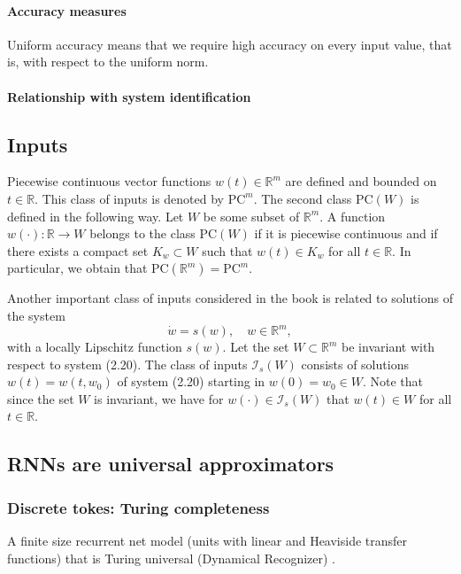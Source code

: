 \documentclass{article}
\theoremstyle{definition}
\theoremstyle{remark}
\begin{document}
\paragraph{Accuracy measures}
Uniform accuracy means that we require high accuracy on every input value, that is, with respect to the uniform norm. 

\paragraph{Relationship with system identification}
\citep{ljung2010perspectives, nelles2020nonlinear}



\subsection{Inputs}
Piecewise continuous vector functions \( w(t) \in \mathbb{R}^m \) are defined and bounded on \( t \in \mathbb{R} \). This class of inputs is denoted by \( \text{PC}^m \). The second class \( \text{PC}(W) \) is defined in the following way. Let \( W \) be some subset of \( \mathbb{R}^m \). A function \( w(\cdot) : \mathbb{R} \to W \) belongs to the class \( \text{PC}(W) \) if it is piecewise continuous and if there exists a compact set \( K_w \subset W \) such that \( w(t) \in K_w \) for all \( t \in \mathbb{R} \). In particular, we obtain that \( \text{PC}(\mathbb{R}^m) = \text{PC}^m \).

Another important class of inputs considered in the book is related to solutions of the system
\[
\dot{w} = s(w), \quad w \in \mathbb{R}^m, \tag{2.20}
\]
with a locally Lipschitz function \( s(w) \). Let the set \( W \subset \mathbb{R}^m \) be invariant with respect to system (2.20). The class of inputs \( \mathcal{I}_s(W) \) consists of solutions \( w(t) = w(t, w_0) \) of system (2.20) starting in \( w(0) = w_0 \in W \). Note that since the set \( W \) is invariant, we have for \( w(\cdot) \in \mathcal{I}_s(W) \) that \( w(t) \in W \) for all \( t \in \mathbb{R} \).




\subsection{RNNs are universal approximators}
\subsubsection{Discrete tokes: Turing completeness}
A finite size recurrent net model (units with linear and Heaviside transfer functions) that is Turing universal (Dynamical Recognizer) \citep{pollack1991induction}.
\end{document}
